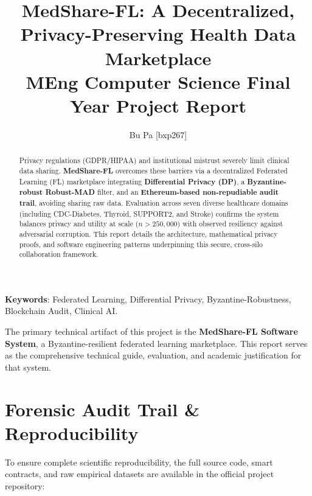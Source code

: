\documentclass[10pt, a4paper, twocolumn]{article}
\title{\textbf{MedShare-FL: A Decentralized, Privacy-Preserving Health Data Marketplace} \\ \Large MEng Computer Science Final Year Project Report}
\author{Bu Pa [bxp267]}
\date{}
\begin{document}
\maketitle

\begin{abstract}
Privacy regulations (GDPR/HIPAA) and institutional mistrust severely limit clinical data sharing. \textbf{MedShare-FL} overcomes these barriers via a decentralized Federated Learning (FL) marketplace integrating \textbf{Differential Privacy (DP)}, a \textbf{Byzantine-robust Robust-MAD} filter, and an \textbf{Ethereum-based non-repudiable audit trail}, avoiding sharing raw data. Evaluation across seven diverse healthcare domains (including CDC-Diabetes, Thyroid, SUPPORT2, and Stroke) confirms the system balances privacy and utility at scale ($n > 250,000$) with observed resiliency against adversarial corruption. This report details the architecture, mathematical privacy proofs, and software engineering patterns underpinning this secure, cross-silo collaboration framework.
\end{abstract}

\textbf{Keywords}: Federated Learning, Differential Privacy, Byzantine-Robustness, Blockchain Audit, Clinical AI.


\begin{center}
\begin{tcolorbox}[colback=blue!5,colframe=blue!75,title=Artifact Declaration]
The primary technical artifact of this project is the \textbf{MedShare-FL Software System}, a Byzantine-resilient federated learning marketplace. This report serves as the comprehensive technical guide, evaluation, and academic justification for that system.
\end{tcolorbox}
\end{center}

\section{Forensic Audit Trail \& Reproducibility}
\label{sec:audit_trail}

To ensure complete scientific reproducibility, the full source code, smart contracts, and raw empirical datasets are available in the official project repository:
\end{document}
